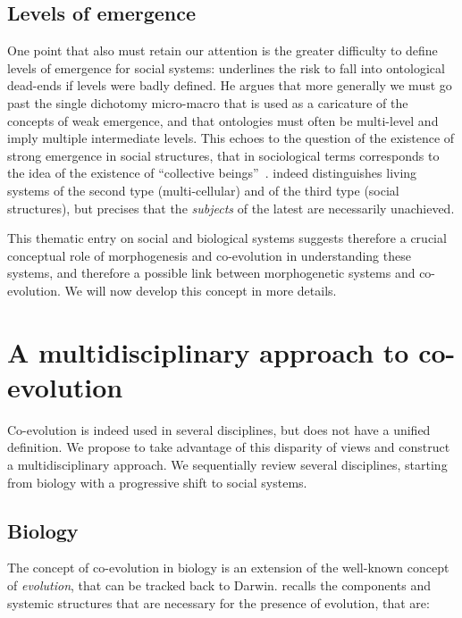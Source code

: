\documentclass[letterpaper]{article}
\begin{document}
\subsection{Levels of emergence}

One point that also must retain our attention is the greater difficulty to define levels of emergence for social systems: \cite{roth2009reconstruction} underlines the risk to fall into ontological dead-ends if levels were badly defined. He argues that more generally we must go past the single dichotomy micro-macro that is used as a caricature of the concepts of weak emergence, and that ontologies must often be multi-level and imply multiple intermediate levels. This echoes to the question of the existence of strong emergence in social structures, that in sociological terms corresponds to the idea of the existence of ``collective beings''~\citep{angeletti2015etres}. \cite{morin1980methode} indeed distinguishes living systems of the second type (multi-cellular) and of the third type (social structures), but precises that the \emph{subjects} of the latest are necessarily unachieved.

\medskip

This thematic entry on social and biological systems suggests therefore a crucial conceptual role of morphogenesis and co-evolution in understanding these systems, and therefore a possible link between morphogenetic systems and co-evolution. We will now develop this concept in more details.


\section{A multidisciplinary approach to co-evolution}

Co-evolution is indeed used in several disciplines, but does not have a unified definition. We propose to take advantage of this disparity of views and construct a multidisciplinary approach. We sequentially review several disciplines, starting from biology with a progressive shift to social systems.


\subsection{Biology}

The concept of co-evolution in biology is an extension of the well-known concept of \emph{evolution}, that can be tracked back to Darwin. \cite{durham1991coevolution} recalls the components and systemic structures that are necessary for the presence of evolution, that are:
\end{document}
